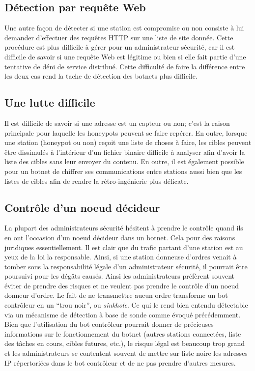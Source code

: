 \subsection{Détection par requête Web}

Une autre façon de détecter si une station est compromise ou non consiste à lui demander d'effectuer
des requêtes HTTP sur une liste de site donnée. Cette procédure est plus difficile à gérer pour un administrateur
sécurité, car il est difficile de savoir si une requête Web est légitime ou bien si elle fait partie d'une tentative
de déni de service distribué. Cette difficulté de faire la différence entre les deux cas rend
la tache de détection des botnets plus difficile.


\subsection{Une lutte difficile}

Il est difficile de savoir si une adresse est un capteur ou non; c'est la raison principale pour laquelle
les honeypots peuvent se faire repérer.
En outre, lorsque une station (honeypot ou non) reçoit une liste de choses à faire, les cibles peuvent
être dissimulés à l'intérieur d'un fichier binaire difficile à analyser afin d'avoir la liste des cibles sans
leur envoyer du contenu. En outre, il est également possible pour un botnet de chiffrer ses communications entre
stations aussi bien que les listes de cibles afin de rendre la rétro-ingénierie plus délicate.

\subsection{Contrôle d'un noeud décideur}

La plupart des administrateurs sécurité hésitent à prendre le contrôle quand ils en ont l'occasion d'un
noeud décideur dans un botnet. Cela pour des raisons juridiques essentiellement. Il est clair que du trafic
partant d'une station est au yeux de la loi la responsable. Ainsi, si une station donneuse d'ordres venait à tomber
sous la responsabilité légale d'un administrateur sécurité, il pourrait être poursuivi pour les dégâts causés.
Ainsi les administrateurs préfèrent souvent éviter de prendre des risques et ne veulent pas prendre le contrôle d'un
noeud donneur d'ordre. Le fait de ne transmettre aucun ordre transforme un bot contrôleur en un ``trou noir'', ou \textit{sinkhole}.
Ce qui le rend bien entendu détectable via un mécanisme de détection à base de sonde comme évoqué précédemment.
Bien que l'utilisation du bot contrôleur pourrait donner de précieuses informations sur le fonctionnement du botnet
(autres stations connectées, liste des tâches en cours, cibles futures, etc.), le risque légal est beaucoup trop
grand et les administrateurs se contentent souvent de mettre sur liste noire les adresses IP répertoriées dans le
bot contrôleur et de ne pas prendre d'autres mesures.
